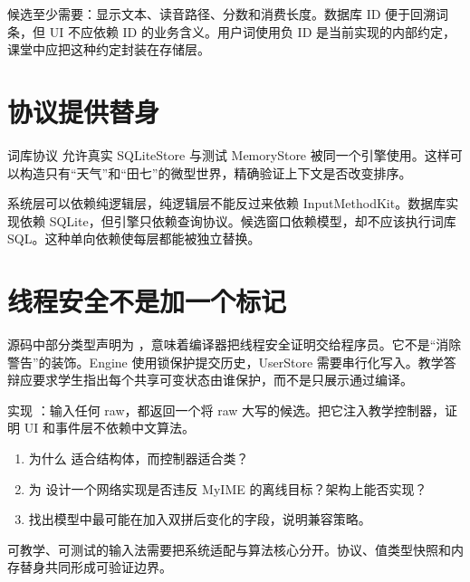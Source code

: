 候选至少需要：显示文本、读音路径、分数和消费长度。数据库 ID 便于回溯词条，但 UI 不应依赖 ID 的业务含义。用户词使用负 ID 是当前实现的内部约定，课堂中应把这种约定封装在存储层。

\section{协议提供替身}

词库协议  允许真实 SQLiteStore 与测试 MemoryStore 被同一个引擎使用。这样可以构造只有“天气”和“田七”的微型世界，精确验证上下文是否改变排序。



\begin{concept}[依赖方向]
系统层可以依赖纯逻辑层，纯逻辑层不能反过来依赖 InputMethodKit。数据库实现依赖 SQLite，但引擎只依赖查询协议。候选窗口依赖模型，却不应该执行词库 SQL。这种单向依赖使每层都能被独立替换。
\end{concept}

\section{线程安全不是加一个标记}

源码中部分类型声明为 ，意味着编译器把线程安全证明交给程序员。它不是“消除警告”的装饰。Engine 使用锁保护提交历史，UserStore 需要串行化写入。教学答辩应要求学生指出每个共享可变状态由谁保护，而不是只展示通过编译。

\begin{lab}[替换引擎]
实现 ：输入任何 raw，都返回一个将 raw 大写的候选。把它注入教学控制器，证明 UI 和事件层不依赖中文算法。
\end{lab}

\exercises
\begin{enumerate}
  \item 为什么  适合结构体，而控制器适合类？
  \item 为  设计一个网络实现是否违反 MyIME 的离线目标？架构上能否实现？
  \item 找出模型中最可能在加入双拼后变化的字段，说明兼容策略。
\end{enumerate}

\begin{summarybox}
可教学、可测试的输入法需要把系统适配与算法核心分开。协议、值类型快照和内存替身共同形成可验证边界。
\end{summarybox}


